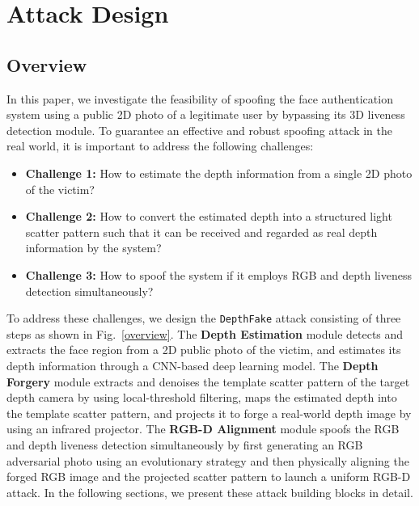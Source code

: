\section{Attack Design}

\subsection{Overview}
 In this paper, we investigate the feasibility of spoofing the face authentication system using a public 2D photo of a legitimate user by bypassing its 3D liveness detection module. 
 To guarantee an effective and robust spoofing attack in the real world, it is important to address the following  challenges:

\begin{itemize}
	\item \textbf{Challenge 1:} 
	How to estimate the depth information from a single 2D photo of the victim?
	\item \textbf{Challenge 2:} 
	How to convert the estimated depth into a structured light scatter pattern such that it can be received and regarded as real depth information by the system?
	\item \textbf{Challenge 3:} 
	How to spoof the system if it employs RGB and depth liveness detection simultaneously?

\end{itemize}

To address these challenges, we design the \texttt{DepthFake} attack consisting of three steps as shown in Fig.~\ref{overview}. 
The \textbf{Depth Estimation} module detects and extracts the face region from a 2D public photo of the victim, and estimates its depth information through a CNN-based deep learning model. 
The \textbf{Depth Forgery} module extracts and denoises the template scatter pattern of the target depth camera by using local-threshold filtering, maps the estimated depth  into the template scatter pattern, and projects it to forge a real-world depth image by using an infrared projector. 
The \textbf{RGB-D Alignment} module spoofs the RGB and depth liveness detection 
simultaneously by first generating an RGB adversarial photo using an evolutionary strategy and then physically aligning the forged RGB image and the projected scatter pattern to launch a uniform RGB-D attack.
In the following sections, we present these attack building blocks in detail.

